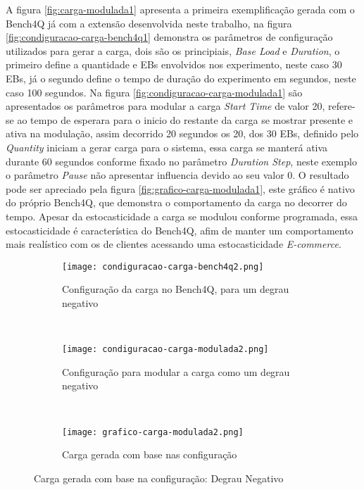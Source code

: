 A figura \ref{fig:carga-modulada1} apresenta a primeira exemplificação gerada com o Bench4Q já com a extensão desenvolvida neste trabalho, na figura \ref{fig:condiguracao-carga-bench4q1} demonstra os parâmetros de configuração utilizados para gerar a carga, dois são os principiais, \textit{Base Load} e \textit{Duration}, o primeiro define a quantidade e EBs envolvidos nos experimento, neste caso 30 EBs, já o segundo define o tempo de duração do experimento em segundos, neste caso 100 segundos. Na figura \ref{fig:condiguracao-carga-modulada1} são apresentados os parâmetros para modular a carga \textit{Start Time} de valor 20, refere-se ao tempo de esperara para o inicio do restante da carga se mostrar presente e ativa na modulação, assim decorrido 20 segundos os 20, dos 30 EBs, definido pelo \textit{Quantity} iniciam a gerar carga para o sistema, essa carga se manterá ativa durante 60 segundos conforme fixado no parâmetro \textit{Duration Step}, neste exemplo o parâmetro \textit{Pause} não apresentar influencia devido ao seu valor 0.
O resultado pode ser apreciado pela figura \ref{fig:grafico-carga-modulada1}, este gráfico é nativo do próprio Bench4Q, que demonstra o comportamento da carga no decorrer do tempo. Apesar da estocasticidade a carga se modulou conforme programada, essa estocasticidade é característica do Bench4Q, afim de manter um comportamento mais realístico com os de clientes acessando uma estocasticidade \textit{E-commerce}.

\begin{figure}[!htb]
	\begin{subfigure}{\linewidth}
		\centering
		\texttt{[image: condiguracao-carga-bench4q2.png]}
		\caption{Configuração da carga no Bench4Q, para um degrau negativo}
		\label{fig:condiguracao-carga-bench4q2}
	\end{subfigure}\\
	\begin{subfigure}{\linewidth}
		\centering
		\texttt{[image: condiguracao-carga-modulada2.png]}
		\caption{Configuração para modular a carga como um degrau negativo}
		\label{fig:condiguracao-carga-modulada2}
	\end{subfigure}\\[1ex]
	\begin{subfigure}{\linewidth}
		\centering
		\texttt{[image: grafico-carga-modulada2.png]}
		\caption{Carga gerada com base nas configuração}
		\label{fig:grafico-carga-modulada2}
	\end{subfigure}
	\caption{Carga gerada com base na configuração: Degrau Negativo}
	\label{fig:carga-modulada2}
	\fautor
\end{figure}

